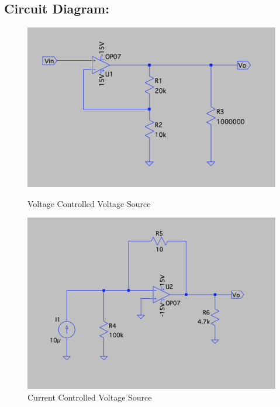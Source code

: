 \documentclass[a4paper,12pt]{report}
\begin{document}
  \subsection{Circuit Diagram:} 
    \begin{figure}[h]
        \centering
        \begin{minipage}{0.45\textwidth}
            \centering
            \includegraphics[width=\linewidth]{../Img/E5VCVS}
            \caption{Voltage Controlled Voltage Source}
        \end{minipage}
        \hfill
        \begin{minipage}{0.45\textwidth}
            \centering
            \includegraphics[width=\linewidth]{../Img/E5CCVS}
            \caption{Current Controlled Voltage Source}
        \end{minipage}
        
        \vspace{6cm}
        

\end{figure}
\end{document}
